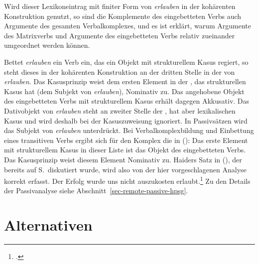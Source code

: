 {Wird dieser Lexikoneintrag mit finiter Form von \emph{erlauben} in der kohärenten Konstruktion genutzt,
so sind die Komplemente des eingebetteten Verbs auch Argumente des gesamten Verbalkomplexes, und
es ist erklärt, warum Argumente des Matrixverbs und Argumente des eingebetteten Verbs
relativ zueinander umgeordnet werden können.

Bettet \emph{erlauben} ein Verb ein, das ein Objekt mit strukturellem Kasus regiert, so steht
dieses in der kohärenten Konstruktion an der dritten Stelle in der \argst von \emph{erlauben}. Das Kasusprinzip weist dem ersten Element in der \argstl, das strukturellen
Kasus hat (dem Subjekt von \emph{erlauben}), Nominativ zu. Das angehobene Objekt des eingebetteten Verbs
mit strukturellem Kasus erhält dagegen Akkusativ. Das Dativobjekt von \emph{erlauben} steht
an zweiter Stelle der \argstl, hat aber lexikalischen Kasus und wird deshalb bei der Kasuszuweisung ignoriert.
In Passivsätzen wird das Subjekt von \emph{erlauben} unterdrückt. Bei Verbalkomplexbildung
und Einbettung eines transitiven Verbs ergibt sich für den Komplex die \argstl in ():
\ea
\argst {}
\z
Das erste Element mit strukturellem Kasus in dieser Liste ist das Objekt des eingebetteten
Verbs. Das Kasusprinzip weist diesem Element Nominativ zu. Haiders Satz in (),
der bereits auf S.\,\pageref{erfolg-auszukosten-erlaubt-kasus} diskutiert wurde,
wird also von der hier vorgeschlagenen Analyse korrekt erfasst.
\ea
{}
Der Erfolg        wurde uns      nicht auszukosten erlaubt.\footnote{
        .%
}
\z
Zu den Details der Passivanalyse siehe Abschnitt~\ref{sec-remote-passive-hpsg}.
%
%

\section{Alternativen}

}
